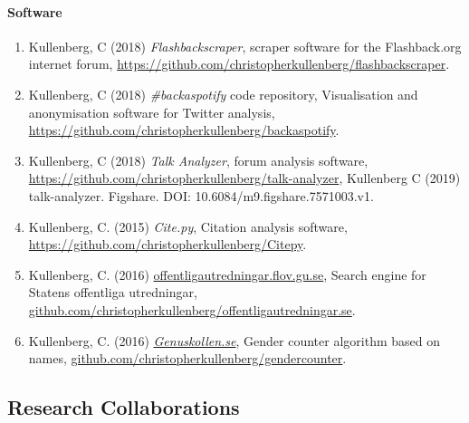 \documentclass[
]{article}
\providecommand{\tightlist}{%
  \setlength{\itemsep}{0pt}\setlength{\parskip}{0pt}}
\begin{document}
\hypertarget{software}{%
\paragraph{Software}\label{software}}

\begin{enumerate}
\def\labelenumi{\arabic{enumi}.}
\tightlist
\item
  Kullenberg, C (2018) \emph{Flashbackscraper}, scraper software for the
  Flashback.org internet forum,
  \url{https://github.com/christopherkullenberg/flashbackscraper}.
\item
  Kullenberg, C (2018) \emph{\#backaspotify} code repository,
  Visualisation and anonymisation software for Twitter analysis,
  \url{https://github.com/christopherkullenberg/backaspotify}.
\item
  Kullenberg, C (2018) \emph{Talk Analyzer}, forum analysis software,
  \url{https://github.com/christopherkullenberg/talk-analyzer},
  Kullenberg C (2019) talk-analyzer. Figshare. DOI:
  10.6084/m9.figshare.7571003.v1.
\item
  Kullenberg, C. (2015) \emph{Cite.py}, Citation analysis software,
  \url{https://github.com/christopherkullenberg/Citepy}.
\item
  Kullenberg, C. (2016)
  \href{http://offentligautredningar.flov.gu.se/}{offentligautredningar.flov.gu.se},
  Search engine for Statens offentliga utredningar,
  \href{https://github.com/christopherkullenberg/offentligautredningar.se}{github.com/christopherkullenberg/offentligautredningar.se}.
\item
  Kullenberg, C. (2016)
  \emph{\href{https://genuskollen.se}{Genuskollen.se}}, Gender counter
  algorithm based on names,
  \href{https://github.com/christopherkullenberg/gendercounter}{github.com/christopherkullenberg/gendercounter}.
\end{enumerate}

\hypertarget{research-collaborations}{%
\subsection{Research Collaborations}\label{research-collaborations}}
\end{document}

